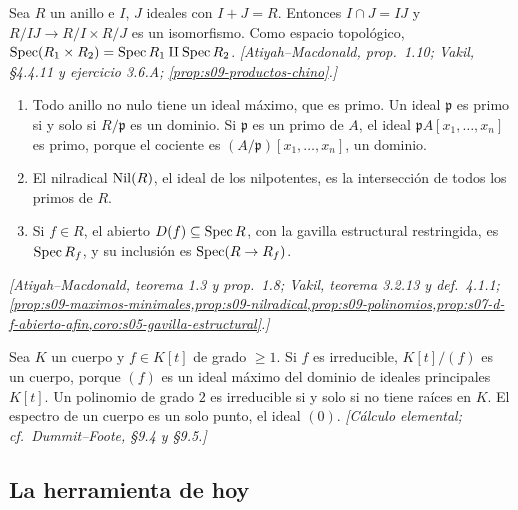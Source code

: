 \begin{prop}
\label{prop:s11-chino}
Sea \(R\) un anillo e \(I\), \(J\) ideales con \(I+J=R\). Entonces \(I\cap J=IJ\) y \(R/IJ\to R/I\times R/J\) es un isomorfismo. Como espacio topológico, \(\operatorname{Spec}(R_1\times R_2)=\operatorname{Spec} R_1\amalg\operatorname{Spec} R_2\). \emph{[Atiyah--Macdonald, prop.~1.10; Vakil, \S4.4.11 y ejercicio 3.6.A; \cref{prop:s09-productos-chino}.]}
\end{prop}

\begin{prop}
\label{prop:s11-primos-nilradical}
\begin{enumerate}[label=(\alph*)]
\item Todo anillo no nulo tiene un ideal máximo, que es primo. Un ideal \(\mathfrak p\) es primo si y solo si \(R/\mathfrak p\) es un dominio. Si \(\mathfrak p\) es un primo de \(A\), el ideal \(\mathfrak p A[x_1,\ldots,x_n]\) es primo, porque el cociente es \((A/\mathfrak p)[x_1,\ldots,x_n]\), un dominio.
\item El nilradical \(\operatorname{Nil}(R)\), el ideal de los nilpotentes, es la intersección de todos los primos de \(R\).
\item Si \(f\in R\), el abierto \(D(f)\subseteq\operatorname{Spec} R\), con la gavilla estructural restringida, es \(\operatorname{Spec} R_f\), y su inclusión es \(\operatorname{Spec}(R\to R_f)\).
\end{enumerate}
\emph{[Atiyah--Macdonald, teorema 1.3 y prop.~1.8; Vakil, teorema 3.2.13 y def.~4.1.1; \cref{prop:s09-maximos-minimales,prop:s09-nilradical,prop:s09-polinomios,prop:s07-d-f-abierto-afin,coro:s05-gavilla-estructural}.]}
\end{prop}

\begin{prop}
\label{prop:s11-cocientes-una-variable}
Sea \(K\) un cuerpo y \(f\in K[t]\) de grado \(\ge1\). Si \(f\) es irreducible, \(K[t]/(f)\) es un cuerpo, porque \((f)\) es un ideal máximo del dominio de ideales principales \(K[t]\). Un polinomio de grado \(2\) es irreducible si y solo si no tiene raíces en \(K\). El espectro de un cuerpo es un solo punto, el ideal \((0)\). \emph{[Cálculo elemental; cf.~Dummit--Foote, \S9.4 y \S9.5.]}
\end{prop}

\subsection{La herramienta de hoy}

